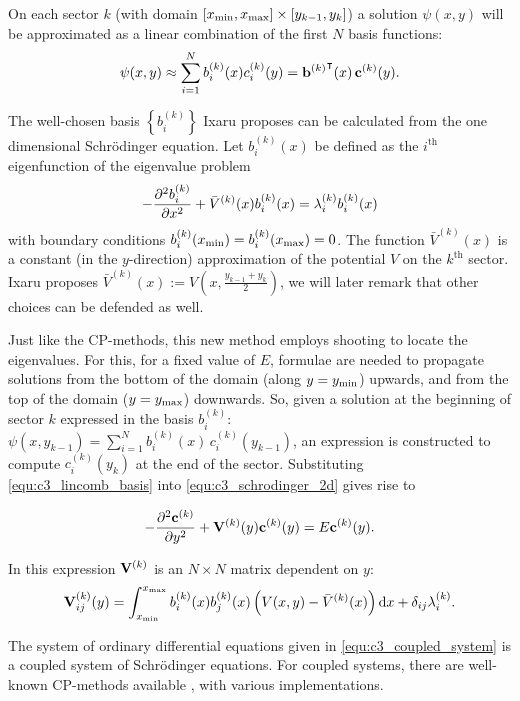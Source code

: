 On each sector $k$ (with domain $[{x_{\text{min}}}, {x_{\text{max}}}]\times[y_{k-1}, y_k]$) a solution $\psi(x, y)$ will be approximated as a linear combination of the first $N$ basis functions:
\begin{equation}\label{equ:c3_lincomb_basis}
    \psi(x, y) \approx \sum_{i=1}^{N} b_i^{(k)}(x) c_i^{(k)}(y) = {{\vb{b}^{(k)}}}^\intercal(x) \, \vb{c}^{(k)}(y) \text{.}
\end{equation}

The well-chosen basis $\left\{b_i^{(k)}\right\}$ Ixaru proposes can be calculated from the one dimensional Schrödinger equation. Let $b_i^{(k)}(x)$ be defined as the $i^\text{th}$ eigenfunction of the eigenvalue problem
$$
    -\pdv[2]{b_i^{(k)}}{x} + \bar{V}^{(k)}(x)b_i^{(k)}(x) = \lambda_i^{(k)} b_i^{(k)}(x)
$$
with boundary conditions $b_i^{(k)}({x_{\text{min}}}) = b_i^{(k)}({x_{\text{max}}}) = 0$. The function $\bar{V}^{(k)}(x)$ is a constant (in the $y$-direction) approximation of the potential $V$ on the $k^\text{th}$ sector. Ixaru proposes $\bar{V}^{(k)}(x) := V\left(x, \frac{y_{k-1} + y_k}{2}\right)$, we will later remark that other choices can be defended as well.

Just like the CP-methods, this new method employs shooting to locate the eigenvalues. For this, for a fixed value of $E$, formulae are needed to propagate solutions from the bottom of the domain (along $y = {y_{\text{min}}}$) upwards, and from the top of the domain ($y = {y_{\text{max}}}$) downwards. So, given a solution at the beginning of sector $k$ expressed in the basis $b_i^{(k)}$:
$ \psi(x, y_{k-1}) = \sum_{i=1}^{N} b_i^{(k)}(x)\, c_i^{(k)}(y_{k-1}) $, an expression is constructed to compute $c^{(k)}_i(y_k)$ at the end of the sector. Substituting \eqref{equ:c3_lincomb_basis} into \eqref{equ:c3_schrodinger_2d} gives rise to

\begin{equation}\label{equ:c3_coupled_system}
    -\pdv[2]{\vb{c}^{(k)}}{y} + \vb{V}^{(k)}(y) \vb{c}^{(k)}(y) = E \vb{c}^{(k)}(y) \text{.}
\end{equation}

In this expression $\vb{V}^{(k)}$ is an $N\times N$ matrix dependent on $y$:
\begin{equation}\label{equ:c3_v_matrix}
    \vb{V}^{(k)}_{ij}(y) = \int_{{x_{\text{min}}}}^{{x_{\text{max}}}} b_i^{(k)}(x) b_j^{(k)}(x) \left(V(x, y) - \bar{V}^{(k)}(x)\right) \dd x + \delta_{ij} \lambda_i^{(k)} \text{.}
\end{equation}

The system of ordinary differential equations given in \eqref{equ:c3_coupled_system} is a coupled system of Schrö\-dinger equations. For coupled systems, there are well-known CP-methods available \cite{ledoux_numerical_2007a,ixaru_lilix_2002}, with various implementations.


